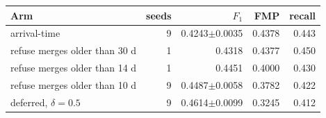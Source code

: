 \begin{tabular}{lrrrr}
\toprule
Arm & seeds & $F_1$ & FMP & recall \\
\midrule
arrival-time & 9 & 0.4243$\pm$0.0035 & 0.4378 & 0.443 \\
refuse merges older than 30 d & 1 & 0.4318 & 0.4377 & 0.450 \\
refuse merges older than 14 d & 1 & 0.4451 & 0.4000 & 0.430 \\
refuse merges older than 10 d & 9 & 0.4487$\pm$0.0058 & 0.3782 & 0.422 \\
\midrule
deferred, $\delta=0.5$ & 9 & 0.4614$\pm$0.0099 & 0.3245 & 0.412 \\
\bottomrule
\end{tabular}